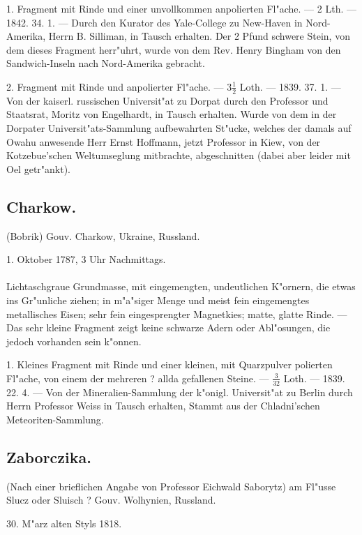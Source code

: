 \documentclass[a4paper, 11pt, oneside, polutonikogreek, german]{article}
\begin{document}
1. Fragment mit Rinde und einer unvollkommen anpolierten Fl"ache. --- 2 Lth. --- 1842. 34. 1. --- Durch den Kurator des Yale-College zu New-Haven in Nord-Amerika, Herrn B. Silliman, in Tausch erhalten. Der 2 Pfund schwere Stein, von dem dieses Fragment herr"uhrt, wurde von dem Rev. Henry Bingham von den Sandwich-Inseln nach Nord-Amerika gebracht.

2. Fragment mit Rinde und anpolierter Fl"ache. --- $3\frac{1}{2}$ Loth. --- 1839. 37. 1. --- Von der kaiserl. russischen Universit"at zu Dorpat durch den Professor und Staatsrat, Moritz von Engelhardt, in Tausch erhalten. Wurde von dem in der Dorpater Universit"ats-Sammlung aufbewahrten St"ucke, welches der damals auf Owahu anwesende Herr Ernst Hoffmann, jetzt Professor in Kiew, von der Kotzebue'schen Weltumseglung mitbrachte, abgeschnitten (dabei aber leider mit Oel getr"ankt).
\subsection{Charkow.}
\begin{center}
\small
(Bobrik) Gouv. Charkow, Ukraine, Russland.

1. Oktober 1787, 3 Uhr Nachmittags.
\end{center}
\paragraph{}
Lichtaschgraue Grundmasse, mit eingemengten, undeutlichen K"ornern, die etwas ins Gr"unliche ziehen; in m"a"siger Menge und meist fein eingemengtes metallisches Eisen; sehr fein eingesprengter Magnetkies; matte, glatte Rinde. --- Das sehr kleine Fragment zeigt keine schwarze Adern oder Abl"osungen, die jedoch vorhanden sein k"onnen.

1. Kleines Fragment mit Rinde und einer kleinen, mit Quarzpulver polierten Fl"ache, von einem der mehreren ? allda gefallenen Steine. --- $\frac{3}{32}$ Loth. --- 1839. 22. 4. --- Von der Mineralien-Sammlung der k"onigl. Universit"at zu Berlin durch Herrn Professor Weiss in Tausch erhalten, Stammt aus der Chladni'schen Meteoriten-Sammlung.
\subsection{Zaborczika.}
\begin{center}
\small
(Nach einer brieflichen Angabe von Professor Eichwald Saborytz) am Fl"usse Slucz oder Sluisch ? Gouv. Wolhynien, Russland.

30. M"arz alten Styls 1818.
\end{center}
\end{document}
